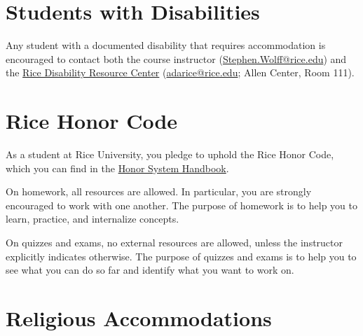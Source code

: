 \newpage

%
%
%
%

\section{Students with Disabilities}

Any student with a documented disability that requires accommodation is encouraged to contact both the course instructor (\href{mailto:Stephen.Wolff@rice.edu?subject=[Math\%20112]}{Stephen.Wolff@rice.edu}) and the \href{https://drc.rice.edu/}{Rice Disability Resource Center} (\href{mailto:adarice@rice.edu}{adarice@rice.edu}; Allen Center, Room 111).





%
%
%
%

\section{Rice Honor Code}
\label{sec : Honor Code}

As a student at Rice University, you pledge to uphold the Rice Honor Code, which you can find in the \href{http://honor.rice.edu/honor-system-handbook/}{Honor System Handbook}.

On homework, all resources are allowed. In particular, you are strongly encouraged to work with one another. The purpose of homework is to help you to learn, practice, and internalize concepts.

On quizzes and exams, no external resources are allowed, unless the instructor explicitly indicates otherwise. The purpose of quizzes and exams is to help you to see what you can do so far and identify what you want to work on.





%
%
%
%







%
%
%
%

\section{Religious Accommodations}

